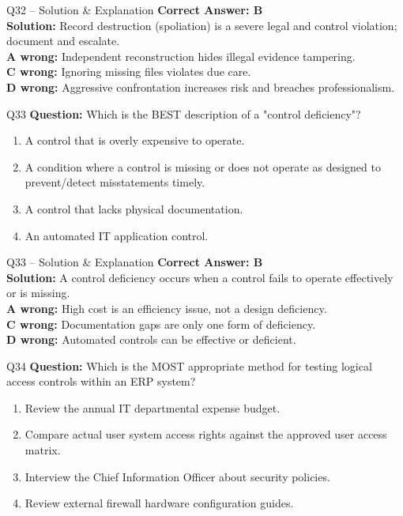 \documentclass[aspectratio=169,10pt]{beamer}
\begin{document}
	\begin{frame}[t]{Q32 -- Solution \& Explanation}
		\small
		\textbf{Correct Answer: B} \\[4pt]
		\textbf{Solution:} Record destruction (spoliation) is a severe legal and control violation; document and escalate. \\[4pt]
		\textbf{A wrong:} Independent reconstruction hides illegal evidence tampering. \\[2pt]
		\textbf{C wrong:} Ignoring missing files violates due care. \\[2pt]
		\textbf{D wrong:} Aggressive confrontation increases risk and breaches professionalism.
	\end{frame}
	
	\begin{frame}[t]{Q33}
		\small
		\textbf{Question:} Which is the BEST description of a "control deficiency"?
		\begin{enumerate}[label=\Alph*.,itemsep=1pt,topsep=2pt]
			\item A control that is overly expensive to operate.
			\item A condition where a control is missing or does not operate as designed to prevent/detect misstatements timely.
			\item A control that lacks physical documentation.
			\item An automated IT application control.
		\end{enumerate}
	\end{frame}
	
	\begin{frame}[t]{Q33 -- Solution \& Explanation}
		\small
		\textbf{Correct Answer: B} \\[4pt]
		\textbf{Solution:} A control deficiency occurs when a control fails to operate effectively or is missing. \\[4pt]
		\textbf{A wrong:} High cost is an efficiency issue, not a design deficiency. \\[2pt]
		\textbf{C wrong:} Documentation gaps are only one form of deficiency. \\[2pt]
		\textbf{D wrong:} Automated controls can be effective or deficient.
	\end{frame}
	
	\begin{frame}[t]{Q34}
		\small
		\textbf{Question:} Which is the MOST appropriate method for testing logical access controls within an ERP system?
		\begin{enumerate}[label=\Alph*.,itemsep=1pt,topsep=2pt]
			\item Review the annual IT departmental expense budget.
			\item Compare actual user system access rights against the approved user access matrix.
			\item Interview the Chief Information Officer about security policies.
			\item Review external firewall hardware configuration guides.
		\end{enumerate}
	\end{frame}
	
\end{document}

